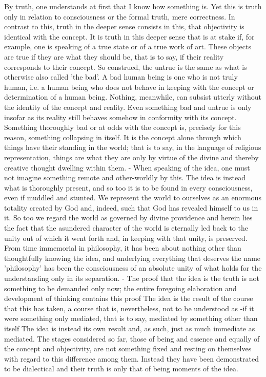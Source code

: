 By truth, one understands at first that I know how something is.
Yet this is truth only in relation to consciousness or the formal truth, mere correctness.
In contrast to this, truth in the deeper sense consists in this,
that objectivity is identical with the concept.
 It is truth in this deeper sense that is
at stake if, for example, one is speaking of a true state or of a true work of art.
These objects are true if they are what they should be, that is to
say, if their reality corresponds to their concept.
So construed, the untrue is the
same as what is otherwise also called 'the bad'.
A bad human being is one who is not truly human, i.e. a human being who does not
behave in keeping with the concept or determination of a human being.
 Nothing, meanwhile, can subsist
utterly without the identity of the concept and reality. Even something bad and
untrue is only insofar as its reality still behaves somehow in conformity with its
concept. Something thoroughly bad or at odds with the concept is, precisely for
this reason, something collapsing in itself. It is the concept alone through which
things have their standing in the world; that is to say, in the language of religious
representation, things are what they are only by virtue of the divine and thereby
creative thought dwelling within them. - When speaking of the idea, one must
not imagine something remote and other-worldly by this. The idea is instead what
is thoroughly present, and so too it is to be found in every consciousness, even
if muddled and stunted. We represent the world to ourselves as an enormous
totality created by God and, indeed, such that God has revealed himself to us in
it. So too we regard the world as governed by divine providence and herein lies the
fact that the asundered character of the world is eternally led back to
the unity out of which it went forth and, in keeping with that unity, is preserved.
From time immemorial in philosophy, it has been about nothing other than
thoughtfully knowing the idea, and underlying everything that deserves the name
'philosophy' has been the consciousness of an absolute unity of what holds for
the understanding only in its separation. - The proof that the idea is the truth
is not something to be demanded only now; the entire foregoing elaboration and
development of thinking contains this proof The idea is the result of the course
that this has taken, a course that is, nevertheless, not to be understood as -if it
were something only mediated, that is to say, mediated by something other than
itself The idea is instead its own result and, as such, just as much immediate as
mediated. The stages considered so far, those of being and essence and equally
of the concept and objectivity, are not something fixed and resting on themselves
with regard to this difference among them. Instead they have been demonstrated
to be dialectical and their truth is only that of being moments of the idea.

